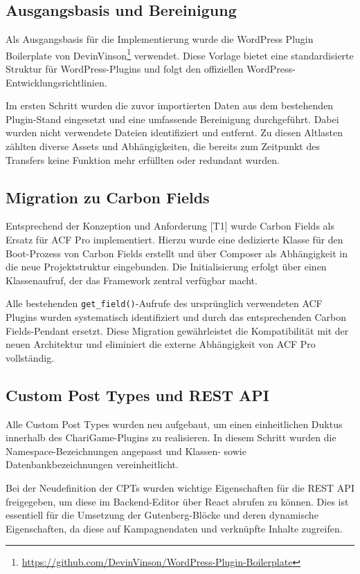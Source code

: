 \subsection{Ausgangsbasis und Bereinigung}
Als Ausgangsbasis für die Implementierung wurde die WordPress Plugin Boilerplate von DevinVinson\footnote{\url{https://github.com/DevinVinson/WordPress-Plugin-Boilerplate}} verwendet.
Diese Vorlage bietet eine standardisierte Struktur für WordPress-Plugins und folgt den offiziellen WordPress-Entwicklungsrichtlinien.

Im ersten Schritt wurden die zuvor importierten Daten aus dem bestehenden Plugin-Stand eingesetzt und eine umfassende Bereinigung durchgeführt.
Dabei wurden nicht verwendete Dateien identifiziert und entfernt.
Zu diesen Altlasten zählten diverse Assets und Abhängigkeiten, die bereits zum Zeitpunkt des Transfers keine Funktion mehr erfüllten oder redundant wurden.

\subsection{Migration zu Carbon Fields}
Entsprechend der Konzeption und Anforderung [T1] wurde Carbon Fields als Ersatz für ACF Pro implementiert.
Hierzu wurde eine dedizierte Klasse für den Boot-Prozess von Carbon Fields erstellt und über Composer als Abhängigkeit in die neue Projektstruktur eingebunden.
Die Initialisierung erfolgt über einen Klassenaufruf, der das Framework zentral verfügbar macht.

Alle bestehenden \texttt{get\_field()}-Aufrufe des ursprünglich verwendeten ACF Plugins wurden systematisch identifiziert und durch das entsprechenden Carbon Fields-Pendant ersetzt.
Diese Migration gewährleistet die Kompatibilität mit der neuen Architektur und eliminiert die externe Abhängigkeit von ACF Pro vollständig.

\subsection{Custom Post Types und REST API}
Alle Custom Post Types wurden neu aufgebaut, um einen einheitlichen Duktus innerhalb des ChariGame-Plugins zu realisieren.
In diesem Schritt wurden die Namespace-Bezeichnungen angepasst und Klassen- sowie Datenbankbezeichnungen vereinheitlicht.

Bei der Neudefinition der CPTs wurden wichtige Eigenschaften für die REST API freigegeben, um diese im Backend-Editor über React abrufen zu können.
Dies ist essentiell für die Umsetzung der Gutenberg-Blöcke und deren dynamische Eigenschaften, da diese auf Kampagnendaten und verknüpfte Inhalte zugreifen.

